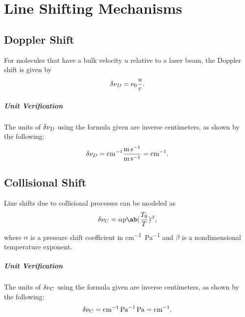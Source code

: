 \chapter{Line Shifting Mechanisms}

\section{Doppler Shift}

For molecules that have a bulk velocity $u$ relative to a laser beam, the Doppler shift is given by \cite[142]{hansonSpectroscopyOpticalDiagnostics2016}
\begin{equation*}
    \fdif{\nu}_D = \nu_0\frac{u}{c}.
\end{equation*}

\paragraph{Unit Verification}

The units of $\fdif{\nu}_D$ using the formula given are inverse centimeters, as shown by the following:
\begin{equation*}
    \fdif{\nu}_D = \unit{cm^{-1}}\frac{\unit{m.s^{-1}}}{\unit{m.s^{-1}}} = \unit{cm^{-1}}.
\end{equation*}

\section{Collisional Shift}

Line shifts due to collisional processes can be modeled as \cite[141]{hansonSpectroscopyOpticalDiagnostics2016}
\begin{equation*}
    \fdif{\nu}_C = \alpha p\ab(\frac{T_0}{T})^\beta,
\end{equation*}
where $\alpha$ is a pressure shift coefficient in \unit{cm^{-1}.Pa^{-1}} and $\beta$ is a nondimensional temperature exponent.

\paragraph{Unit Verification}

The units of $\fdif{\nu}_C$ using the formula given are inverse centimeters, as shown by the following:
\begin{equation*}
    \fdif{\nu}_C = \unit{cm^{-1}.Pa^{-1}.Pa} = \unit{cm^{-1}}.
\end{equation*}
